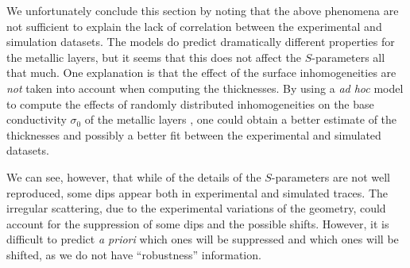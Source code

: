 We unfortunately conclude this section by noting that the above phenomena
are not sufficient to explain the lack of correlation between the experimental
and simulation datasets. The models do predict dramatically different properties
for the metallic layers, but it seems that this does not affect the $S$-parameters
all that much. One explanation is that the effect of the surface inhomogeneities
are \textit{not} taken into account when computing the thicknesses. By using a
\textit{ad hoc} model to compute the effects of randomly distributed inhomogeneities
on the base conductivity $\sigma_0$ of the metallic layers \cite{CUR2012}, one could obtain a better
estimate of the thicknesses and possibly a better fit between the experimental and simulated datasets.

We can see, however, that while of the details of the $S$-parameters are not well reproduced, some
dips appear both in experimental and simulated traces. The irregular scattering, due to the experimental
variations of the geometry, could account for the suppression of some dips and the possible shifts. 
However, it is difficult to predict \textit{a priori} which ones will be suppressed and which ones will
be shifted, as we do not have ``robustness'' information. 